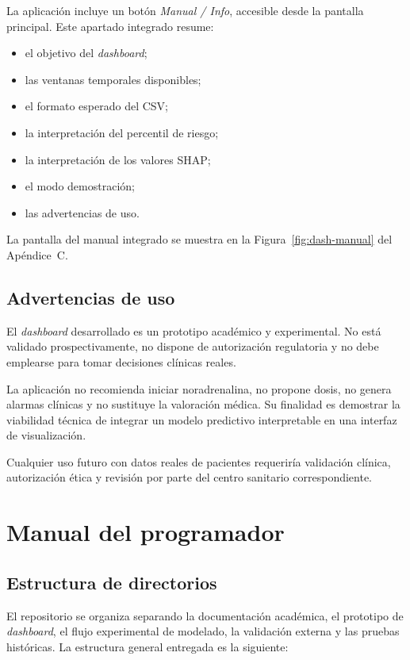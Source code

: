 \documentclass[
  spanish,
  a4paper,
  12pt,
  twoside]{memoir}
\newcommand{\apendice}[1]{\chapter{#1}}
\begin{document}
La aplicación incluye un botón \emph{Manual / Info}, accesible desde la pantalla principal. Este apartado integrado resume:

\begin{itemize}
  \item el objetivo del \textit{dashboard};
  \item las ventanas temporales disponibles;
  \item el formato esperado del CSV;
  \item la interpretación del percentil de riesgo;
  \item la interpretación de los valores SHAP;
  \item el modo demostración;
  \item las advertencias de uso.
\end{itemize}

La pantalla del manual integrado se muestra en la Figura~\ref{fig:dash-manual} del Apéndice~C.

\section{Advertencias de uso}

El \textit{dashboard} desarrollado es un prototipo académico y experimental. No está validado prospectivamente, no dispone de autorización regulatoria y no debe emplearse para tomar decisiones clínicas reales.

La aplicación no recomienda iniciar noradrenalina, no propone dosis, no genera alarmas clínicas y no sustituye la valoración médica. Su finalidad es demostrar la viabilidad técnica de integrar un modelo predictivo interpretable en una interfaz de visualización.

Cualquier uso futuro con datos reales de pacientes requeriría validación clínica, autorización ética y revisión por parte del centro sanitario correspondiente.

\apendice{Manual del programador}

\section{Estructura de directorios}

El repositorio se organiza separando la documentación académica, el prototipo de \textit{dashboard}, el flujo experimental de modelado, la validación externa y las 
pruebas históricas. La estructura general entregada es la siguiente:
\end{document}
